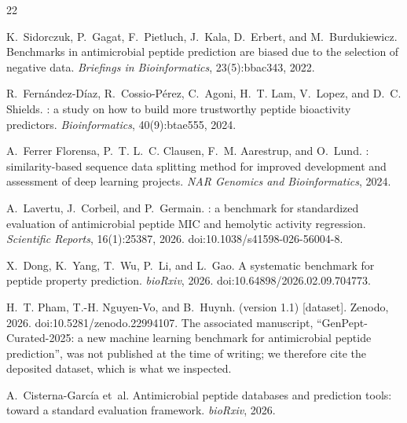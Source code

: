 \documentclass[11pt,a4paper]{article}
\begin{document}
\begin{thebibliography}{22}

K.~Sidorczuk, P.~Gagat, F.~Pietluch, J.~Kala, D.~Erbert, and M.~Burdukiewicz.
\newblock Benchmarks in antimicrobial peptide prediction are biased due to the selection
  of negative data.
\newblock \emph{Briefings in Bioinformatics}, 23(5):bbac343, 2022.

R.~Fern\'andez-D\'iaz, R.~Cossio-P\'erez, C.~Agoni, H.~T. Lam, V.~Lopez, and D.~C. Shields.
: a study on how to build more trustworthy peptide bioactivity
  predictors.
\newblock \emph{Bioinformatics}, 40(9):btae555, 2024.

A.~Ferrer Florensa, P.~T. L.~C. Clausen, F.~M. Aarestrup, and O.~Lund.
: similarity-based sequence data splitting method for improved
  development and assessment of deep learning projects.
\newblock \emph{NAR Genomics and Bioinformatics}, 2024.

A.~Lavertu, J.~Corbeil, and P.~Germain.
: a benchmark for standardized evaluation of antimicrobial peptide {MIC}
  and hemolytic activity regression.
\newblock \emph{Scientific Reports}, 16(1):25387, 2026.
\newblock doi:10.1038/s41598-026-56004-8.

X.~Dong, K.~Yang, T.~Wu, P.~Li, and L.~Gao.
\newblock A systematic benchmark for peptide property prediction.
\newblock \emph{bioRxiv}, 2026.
\newblock doi:10.64898/2026.02.09.704773.

H.~T. Pham, T.-H. Nguyen-Vo, and B.~Huynh.
 (version 1.1) [dataset].
\newblock Zenodo, 2026. doi:10.5281/zenodo.22994107.
\newblock The associated manuscript, ``{GenPept-Curated-2025}: a new machine learning
  benchmark for antimicrobial peptide prediction'', was not published at the time of
  writing; we therefore cite the deposited dataset, which is what we inspected.

A.~Cisterna-Garc\'ia et~al.
\newblock Antimicrobial peptide databases and prediction tools: toward a standard
  evaluation framework.
\newblock \emph{bioRxiv}, 2026.


\end{thebibliography}
\end{document}
